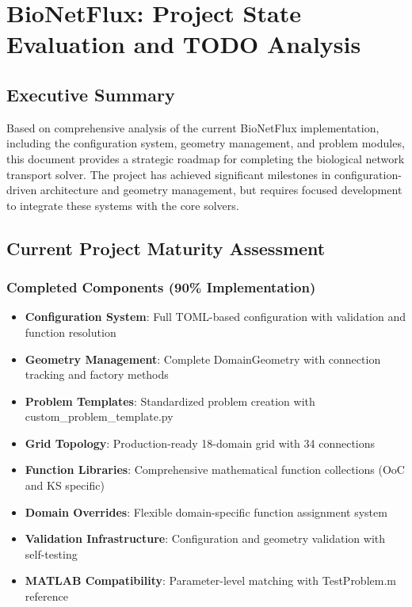 %

\section{BioNetFlux: Project State Evaluation and TODO Analysis}

\subsection{Executive Summary}

Based on comprehensive analysis of the current BioNetFlux implementation, including the configuration system, geometry management, and problem modules, this document provides a strategic roadmap for completing the biological network transport solver. The project has achieved significant milestones in configuration-driven architecture and geometry management, but requires focused development to integrate these systems with the core solvers.

\subsection{Current Project Maturity Assessment}

\subsubsection{Completed Components (90\% Implementation)}
\begin{itemize}
    \item \textbf{Configuration System}: Full TOML-based configuration with validation and function resolution
    \item \textbf{Geometry Management}: Complete DomainGeometry with connection tracking and factory methods
    \item \textbf{Problem Templates}: Standardized problem creation with custom\_problem\_template.py
    \item \textbf{Grid Topology}: Production-ready 18-domain grid with 34 connections
    \item \textbf{Function Libraries}: Comprehensive mathematical function collections (OoC and KS specific)
    \item \textbf{Domain Overrides}: Flexible domain-specific function assignment system
    \item \textbf{Validation Infrastructure}: Configuration and geometry validation with self-testing
    \item \textbf{MATLAB Compatibility}: Parameter-level matching with TestProblem.m reference
\end{itemize}

